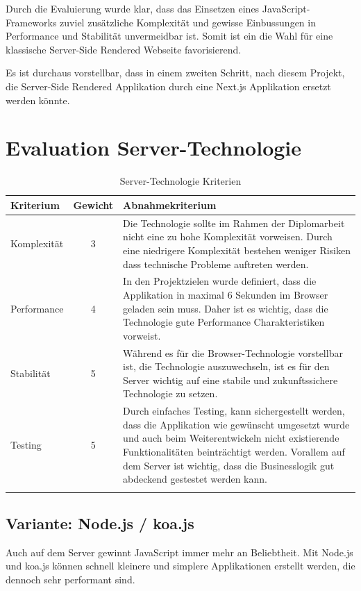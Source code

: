 Durch die Evaluierung wurde klar, dass das Einsetzen eines JavaScript-Frameworks
zuviel zusätzliche Komplexität und gewisse Einbussungen in Performance und Stabilität
unvermeidbar ist. Somit ist ein die Wahl für eine klassische Server-Side Rendered
Webseite favorisierend.

Es ist durchaus vorstellbar, dass in einem zweiten Schritt, nach diesem Projekt,
die Server-Side Rendered Applikation durch eine Next.js Applikation ersetzt werden
könnte.

\clearpage
\section{Evaluation Server-Technologie}\label{evaluation-server-technologie}

\begin{longtable}[]{@{}p{2cm}cp{10cm}@{}}
  \toprule
  \textbf{Kriterium} & \textbf{Gewicht} & \textbf{Abnahmekriterium}\tabularnewline
  \midrule
  \endhead
  Komplexität        & 3                & Die Technologie sollte im Rahmen der Diplomarbeit nicht eine zu hohe Komplexität vorweisen. Durch eine niedrigere Komplexität bestehen weniger Risiken dass technische Probleme auftreten werden.\tabularnewline
  \midrule
  Performance        & 4                & In den Projektzielen wurde definiert, dass die Applikation in maximal 6 Sekunden im Browser geladen sein muss. Daher ist es wichtig, dass die Technologie gute Performance Charakteristiken vorweist.\tabularnewline
  \midrule
  Stabilität         & 5                & Während es für die Browser-Technologie vorstellbar ist, die Technologie auszuwechseln, ist es für den Server wichtig auf eine stabile und zukunftssichere Technologie zu setzen.\tabularnewline
  \midrule
  Testing            & 5                & Durch einfaches Testing, kann sichergestellt werden, dass die Applikation wie gewünscht umgesetzt wurde und auch beim Weiterentwickeln nicht existierende Funktionalitäten beinträchtigt werden. Vorallem auf dem Server ist wichtig, dass die Businesslogik gut abdeckend gestestet werden kann.\tabularnewline
  \bottomrule
  \caption{Server-Technologie Kriterien}
\end{longtable}

\subsection{Variante: Node.js / koa.js}

Auch auf dem Server gewinnt JavaScript immer mehr an Beliebtheit.
Mit Node.js und koa.js können schnell kleinere und simplere Applikationen
erstellt werden, die dennoch sehr performant sind.

